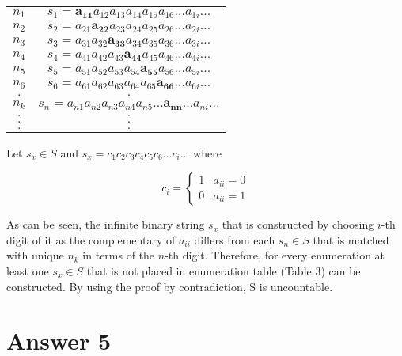 \documentclass[11pt]{article}
\begin{document}
\begin{enumerate}
\begin{table}[H]
	\caption{}
	\label{table1}
	\begin{center}
		\begin{tabular}{ c | c }
			 $n_1$ & $s_1 = \boldsymbol{a_{11}}a_{12}a_{13}a_{14}a_{15}a_{16}...a_{1i}...$  \\
			 $n_2$ & $s_2 = a_{21}\boldsymbol{a_{22}}a_{23}a_{24}a_{25}a_{26}...a_{2i}...$  \\
			 $n_3$ & $s_3 = a_{31}a_{32}\boldsymbol{a_{33}}a_{34}a_{35}a_{36}...a_{3i}...$  \\
			 $n_4$ & $s_4 = a_{41}a_{42}a_{43}\boldsymbol{a_{44}}a_{45}a_{46}...a_{4i}...$  \\
			 $n_5$ & $s_5 = a_{51}a_{52}a_{53}a_{54}\boldsymbol{a_{55}}a_{56}...a_{5i}...$  \\
			 $n_6$ & $s_6 = a_{61}a_{62}a_{63}a_{64}a_{65}\boldsymbol{a_{66}}...a_{6i}...$  \\
			 $.$ & $.$ \\
			 $n_k$ & $s_n = a_{n1}a_{n2}a_{n3}a_{n4}a_{n5}...\boldsymbol{a_{nn}}...a_{ni}...$  \\
			 $.$ & $.$ \\
			 $.$ & $.$ \\
			 $.$ & $.$ \\
		\end{tabular}
	\end{center}
\end{table}

Let $s_x \in S$ and $s_x = c_{1}c_{2}c_{3}c_{4}c_{5}c_{6}...c_{i}...$ where

\[ c_{i} = \begin{cases} 
1 & a_{ii} = 0 \\
0 & a_{ii} = 1
\end{cases}
\]

As can be seen, the infinite binary string $s_x$ that is constructed by choosing $i$-th digit of it as the complementary of $a_{ii}$ differs from each $s_{n} \in S$ that is matched with unique $n_{k}$ in terms of the $n$-th digit. Therefore, for every enumeration at least one $s_x \in S$ that is not placed in enumeration table (Table 3) can be constructed. By using the proof by contradiction, S is uncountable.

\end{enumerate}

\section*{Answer 5}
\end{document}
